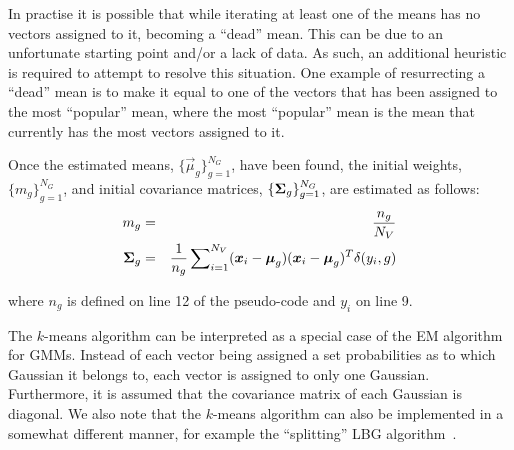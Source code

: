 In practise it is possible that while iterating at least one of the means has no vectors assigned to it,
becoming a ``dead'' mean.
This can be due to an unfortunate starting point and/or a lack of data.
As such, an additional heuristic is required to attempt to resolve this situation.
One example of resurrecting a ``dead'' mean is to make it equal to one of the vectors
that has been assigned to the most ``popular'' mean,
where the most ``popular'' mean is the mean that currently has the most vectors assigned to it.

Once the estimated means, $\{ \Vec{\mu}_g \}_{g=1}^{N_G}$, have been found,
the initial weights, $\{ m_g \}_{g=1}^{N_G}$, and initial covariance matrices, $\{ {{\boldsymbol{\Sigma}}_g} \}_{g=1}^{N_G}$,
are estimated as follows:
%
\begin{eqnarray}
m_g & = & \frac{n_g}{N_V} \\
{\mbox {\boldmath $\Sigma$}_g} & = & \frac{1}{n_g} \sum\nolimits_{i=1}^{N_V} (\Vec{x}_i - \Vec{\mu}_g)(\Vec{x}_i - \Vec{\mu}_g)^T \delta(y_i, g)
\label{eqn:k-means_cov}
\end{eqnarray}

\noindent
where $n_g$ is defined on line 12 of the pseudo-code and $y_i$ on line 9.

The $k$-means algorithm can be interpreted as a special case of the EM algorithm for GMMs.
Instead of each vector being assigned a set probabilities as to which Gaussian it belongs to,
each vector is assigned to only one Gaussian.
Furthermore, it is assumed that the covariance matrix of each Gaussian is diagonal.
We also note that the $k$-means algorithm can also be implemented in a somewhat different manner, 
for example the ``splitting'' LBG algorithm~\cite{Linde80}.

